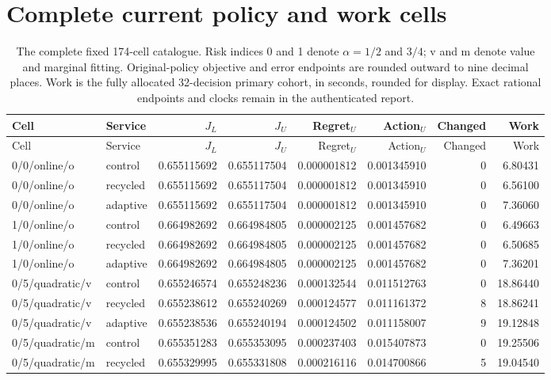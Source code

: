 \section{Complete current policy and work cells}\label{dev:allcells122}
\begingroup\setlength{\tabcolsep}{2pt}\scriptsize
\begin{longtable}{llrrrrrr}
\caption{The complete fixed 174-cell catalogue. Risk indices 0 and 1 denote $\alpha=1/2$ and $3/4$; v and m denote value and marginal fitting. Original-policy objective and error endpoints are rounded outward to nine decimal places. Work is the fully allocated 32-decision primary cohort, in seconds, rounded for display. Exact rational endpoints and clocks remain in the authenticated report.}\label{tab:allcells122}\\
\hline Cell & Service & $J_L$ & $J_U$ & Regret$_U$ & Action$_U$ & Changed & Work \\ \hline\endfirsthead
\hline Cell & Service & $J_L$ & $J_U$ & Regret$_U$ & Action$_U$ & Changed & Work \\ \hline\endhead
0/0/online/o & control & 0.655115692 & 0.655117504 & 0.000001812 & 0.001345910 & 0 & 6.80431 \\
0/0/online/o & recycled & 0.655115692 & 0.655117504 & 0.000001812 & 0.001345910 & 0 & 6.56100 \\
0/0/online/o & adaptive & 0.655115692 & 0.655117504 & 0.000001812 & 0.001345910 & 0 & 7.36060 \\
1/0/online/o & control & 0.664982692 & 0.664984805 & 0.000002125 & 0.001457682 & 0 & 6.49663 \\
1/0/online/o & recycled & 0.664982692 & 0.664984805 & 0.000002125 & 0.001457682 & 0 & 6.50685 \\
1/0/online/o & adaptive & 0.664982692 & 0.664984805 & 0.000002125 & 0.001457682 & 0 & 7.36201 \\
0/5/quadratic/v & control & 0.655246574 & 0.655248236 & 0.000132544 & 0.011512763 & 0 & 18.86440 \\
0/5/quadratic/v & recycled & 0.655238612 & 0.655240269 & 0.000124577 & 0.011161372 & 8 & 18.86241 \\
0/5/quadratic/v & adaptive & 0.655238536 & 0.655240194 & 0.000124502 & 0.011158007 & 9 & 19.12848 \\
0/5/quadratic/m & control & 0.655351283 & 0.655353095 & 0.000237403 & 0.015407873 & 0 & 19.25506 \\
0/5/quadratic/m & recycled & 0.655329995 & 0.655331808 & 0.000216116 & 0.014700866 & 5 & 19.04540 \\

\end{longtable}
